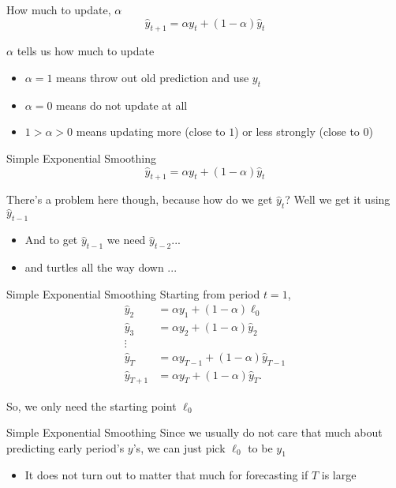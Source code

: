 \documentclass[aspectratio=169,t,11pt,table]{beamer}
\begin{document}
\begin{frame}{How much to update, $\alpha$}
  \vspace*{-\bigskipamount}
  $$
    \hat{y}_{t+1} = \alpha y_t + (1 - \alpha) \hat{y}_{t}
  $$

  \bigskip
  $\alpha$ tells us how much to update
  \begin{itemize}
    \item $\alpha = 1$ means throw out old prediction and use $y_t$
    
    \item $\alpha = 0$ means do not update at all
    
    \item $1 > \alpha > 0$ means updating more (close to $1$) or less strongly (close to $0$)
  \end{itemize}
\end{frame}

\begin{frame}{Simple Exponential Smoothing}
  \vspace*{-\bigskipamount}
  $$
    \hat{y}_{t+1} = \alpha y_t + (1 - \alpha) \hat{y}_{t}
  $$
  
  \bigskip
  There's a problem here though, because how do we get $\hat{y}_{t}$? Well we get it using $\hat{y}_{t-1}$
  \begin{itemize}
    \item And to get $\hat{y}_{t-1}$ we need $\hat{y}_{t-2}$...
    \item and turtles all the way down ...
  \end{itemize}
\end{frame}

\begin{frame}{Simple Exponential Smoothing}
  Starting from period $t = 1$, 
  \begin{align*}
    \hat{y}_{2} &= \alpha y_1 + (1-\alpha) \ell_0\\
    \hat{y}_{3} &= \alpha y_2 + (1-\alpha) \hat{y}_{2}\\
    \vdots\\
    \hat{y}_{T} &= \alpha y_{T-1} + (1-\alpha) \hat{y}_{T-1}\\
    \hat{y}_{T+1} &= \alpha y_T + (1-\alpha) \hat{y}_{T}.
  \end{align*}

  So, we only need the starting point $\ell_0$
\end{frame}

\begin{frame}{Simple Exponential Smoothing}
  Since we usually do not care that much about predicting early period's $y$'s, we can just pick $\ell_0$ to be $y_1$ 
  \begin{itemize}
    \item It does not turn out to matter that much for forecasting if $T$ is large
  \end{itemize}
\end{frame}
\end{document}
